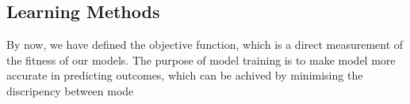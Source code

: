 \subsection {Learning Methods}
By now, we have defined the objective function, which is a direct measurement of the fitness of our models. The purpose of model training is to make model more accurate in predicting outcomes, which can be achived by minimising the discripency between mode